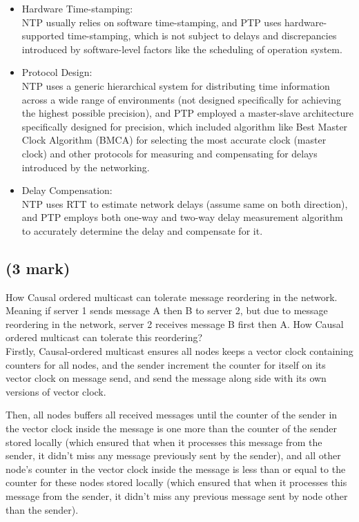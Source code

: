 \documentclass[11pt]{article}
\begin{document}
\begin{itemize}
	\item Hardware Time-stamping: \\ NTP usually relies on software time-stamping, and PTP uses hardware-supported time-stamping, which is not subject to delays and discrepancies introduced by software-level factors like the scheduling of operation system.
	
	\item Protocol Design: \\ NTP uses a generic hierarchical system for distributing time information across a wide range of environments (not designed specifically for achieving the highest possible precision), and PTP employed a master-slave architecture specifically designed for precision, which included algorithm like Best Master Clock Algorithm (BMCA) for selecting the most accurate clock (master clock) and other protocols for measuring and compensating for delays introduced by the networking.
	
	\item Delay Compensation: \\ NTP uses RTT to estimate network delays (assume same on both direction), and PTP employs both one-way and two-way delay measurement algorithm to accurately determine the delay and compensate for it.
	
\end{itemize}

\newpage
\subsection{(3 mark)}
How Causal ordered multicast can tolerate message reordering in the network. Meaning if server 1 sends message A then B to server 2, but due to message reordering in the network, server 2 receives message B first then A. How Causal ordered multicast can tolerate this reordering? \\

Firstly, Causal-ordered multicast ensures all nodes keeps a vector clock containing counters for all nodes, and the sender increment the counter for itself on its vector clock on message send, and send the message along side with its own versions of vector clock.

Then, all nodes buffers all received messages until the counter of the sender in the vector clock inside the message is one more than the counter of the sender stored locally (which ensured that when it processes this message from the sender, it didn't miss any message previously sent by the sender), and all other node's counter in the vector clock inside the message is less than or equal to the counter for these nodes stored locally (which ensured that when it processes this message from the sender, it didn't miss any previous message sent by node other than the sender).
\end{document}
